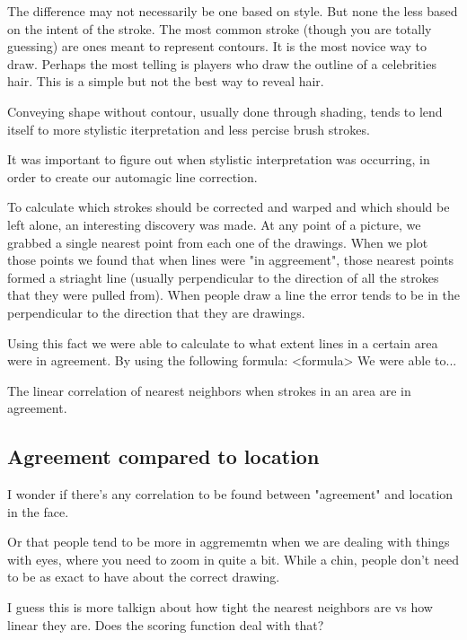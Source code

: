 The difference may not necessarily be one based on style. But none the less based on the intent of the stroke. The most common stroke (though you are totally guessing) are ones meant to represent contours. It is the most novice way to draw. Perhaps the most telling is players who draw the outline of a celebrities hair. This is a simple but not the best way to reveal hair.

Conveying shape without contour, usually done through shading, tends to lend itself to more stylistic iterpretation and less percise brush strokes.

It was important to figure out when stylistic interpretation was occurring, in order to create our automagic line correction.

To calculate which strokes should be corrected and warped and which should be left alone, an interesting discovery was made. At any point of a picture, we grabbed a single nearest point from each one of the drawings. When we plot those points we found that when lines were "in aggreement", those nearest points formed a striaght line (usually perpendicular to the direction of all the strokes that they were pulled from). When people draw a line the error tends to be in the perpendicular to the direction that they are drawings.

Using this fact we were able to calculate to what extent lines in a certain area were in agreement. By using the following formula:
<formula>
We were able to...

The linear correlation of nearest neighbors when strokes in an area are in agreement.

\subsection{Agreement compared to location}
I wonder if there's any correlation to be found between "agreement" and location in the face.

Or that people tend to be more in aggrememtn when we are dealing with things with eyes, where you need to zoom in quite a bit. While a chin, people don't need to be as exact to have about the correct drawing.

I guess this is more talkign about how tight the nearest neighbors are vs how linear they are. Does the scoring function deal with that?


